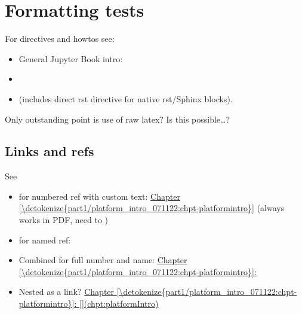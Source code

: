 \documentclass[letterpaper,10pt,english]{jupyterBook}
\begin{document}
\chapter{Formatting tests}
\label{\detokenize{tests/formatting_syntax_tests_081122:formatting-tests}}\label{\detokenize{tests/formatting_syntax_tests_081122::doc}}
\sphinxAtStartPar
For directives and how\sphinxhyphen{}tos see:
\begin{itemize}
\item {} 
\sphinxAtStartPar
General Jupyter Book intro: 

\item {} 
\sphinxAtStartPar
{}

\item {} 
\sphinxAtStartPar
{} (includes direct rst directive for native rst/Sphinx blocks).

\end{itemize}

\sphinxAtStartPar
Only outstanding point is use of raw latex? Is this possible…?


\section{Links and refs}
\label{\detokenize{tests/formatting_syntax_tests_081122:links-and-refs}}
\sphinxAtStartPar
See 
\begin{itemize}
\item {} 
\sphinxAtStartPar
{} for numbered ref with custom text: \hyperref[\detokenize{part1/platform_intro_071122:chpt-platformintro}]{Chapter \ref{\detokenize{part1/platform_intro_071122:chpt-platformintro}}} (always works in PDF, need to )

\item {} 
\sphinxAtStartPar
{} for named ref: {\hyperref[\detokenize{part1/platform_intro_071122:chpt-platformintro}]{}}

\item {} 
\sphinxAtStartPar
Combined for full number and name: \hyperref[\detokenize{part1/platform_intro_071122:chpt-platformintro}]{Chapter \ref{\detokenize{part1/platform_intro_071122:chpt-platformintro}}:} {\hyperref[\detokenize{part1/platform_intro_071122:chpt-platformintro}]{}}

\item {} 
\sphinxAtStartPar
Nested as a link? \hyperref[\detokenize{part1/platform_intro_071122:chpt-platformintro}]{Chapter \ref{\detokenize{part1/platform_intro_071122:chpt-platformintro}}: {[}{]}(chpt:platformIntro)}

\end{itemize}
\end{document}
